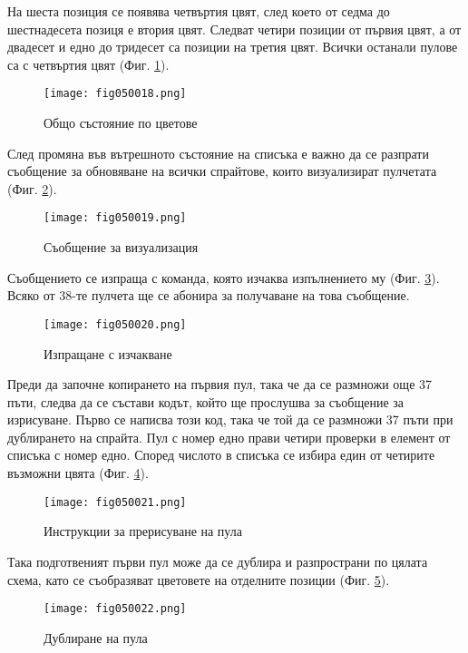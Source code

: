 На шеста позиция се появява четвъртия цвят, след което от седма до шестнадесета позиця е втория цвят. Следват четири позиции от първия цвят, а от двадесет и едно до тридесет са позиции на третия цвят. Всички останали пулове са с четвъртия цвят (Фиг. \ref{fig050018}).

\begin{figure}[H]
  \centering
  \texttt{[image: fig050018.png]}
  \caption{Общо състояние по цветове}
\label{fig050018}
\end{figure}

След промяна във вътрешното състояние на списъка е важно да се разпрати съобщение за обновяване на всички спрайтове, които визуализират пулчетата (Фиг. \ref{fig050019}). 

\begin{figure}[H]
  \centering
  \texttt{[image: fig050019.png]}
  \caption{Съобщение за визуализация}
\label{fig050019}
\end{figure}

Съобщението се изпраща с команда, която изчаква изпълнението му (Фиг. \ref{fig050020}). Всяко от 38-те пулчета ще се абонира за получаване на това съобщение. 

\begin{figure}[H]
  \centering
  \texttt{[image: fig050020.png]}
  \caption{Изпращане с изчакване}
\label{fig050020}
\end{figure}

Преди да започне копирането на първия пул, така че да се размножи още 37 пъти, следва да се състави кодът, който ще прослушва за съобщение за изрисуване. Първо се написва този код, така че той да се размножи 37 пъти при дублирането на спрайта. Пул с номер едно прави четири проверки в елемент от списъка с номер едно. Според числото в списъка се избира един от четирите възможни цвята (Фиг. \ref{fig050021}).

\begin{figure}[H]
  \centering
  \texttt{[image: fig050021.png]}
  \caption{Инструкции за прерисуване на пула}
\label{fig050021}
\end{figure}

Така подготвеният първи пул може да се дублира и разпространи по цялата схема, като се съобразяват цветовете на отделните позиции (Фиг. \ref{fig050022}). 

\begin{figure}[H]
  \centering
  \texttt{[image: fig050022.png]}
  \caption{Дублиране на пула}
\label{fig050022}
\end{figure}

